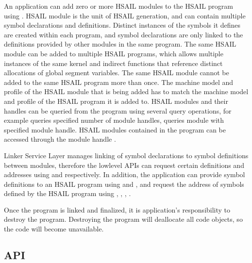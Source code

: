 \documentclass[final]{book}
\begin{document}
An application can add zero or more HSAIL modules 
to the HSAIL program using . HSAIL module is the unit
of HSAIL generation, and can contain multiple symbol declarations and
definitions. Distinct instances of the symbols it defines are created within
each program, and symbol declarations are only linked to the definitions
provided by other modules in the same program. The same HSAIL module can be
added to multiple HSAIL programs, which allows multiple instances of the same
kernel and indirect functions that reference distinct allocations of global
segment variables.  The same HSAIL module cannot be added to the same HSAIL
program more than once. The machine model and profile of the HSAIL module that
is being added has to match the machine model and profile of the HSAIL program
it is added to. HSAIL modules and their handles can be queried from the program
using several query operations, for example
 queries specified number of module
handles,  queries module with
specified module handle. HSAIL modules contained in the program can be accessed
through the module handle .

Linker Service Layer manages linking of symbol declarations to symbol
definitions between modules, therefore the low\-level APIs can request certain
definitions and addresses using 
and  respectively. In addition, the
application can provide symbol definitions to an HSAIL program using
 and
, and request the address of
symbols defined by the HSAIL program using
,
,
,
.

Once the program is linked and finalized, it is application's responsibility to
destroy the program. Destroying the program will deallocate all code objects, so
the code will become unavailable.

\subsection{API}

\end{document}

